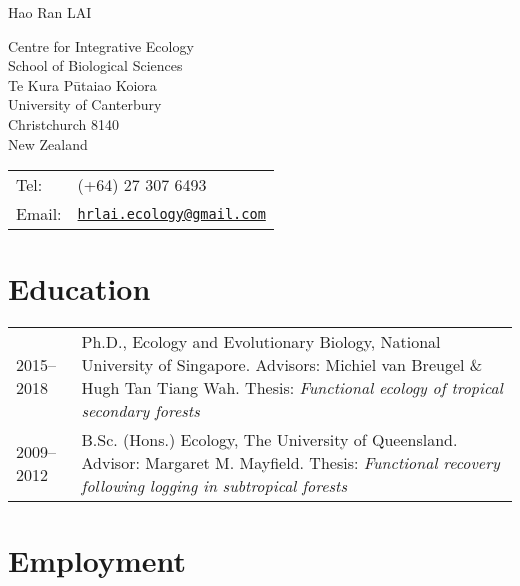 \documentclass[a4paper]{article}
\def\name{Hao Ran LAI}
\begin{document}
{\huge \name}


\vspace{0.25in}

\begin{minipage}{0.45\linewidth}
  Centre for Integrative Ecology \\
  School of Biological Sciences \\
  Te Kura Pūtaiao Koiora  \\
  University of Canterbury \\
  Christchurch 8140 \\
  New Zealand
\end{minipage}
\begin{minipage}{0.45\linewidth}
  \begin{tabular}{ll}
    Tel:   & (+64) 27 307 6493 \\
    Email: & \href{mailto:hrlai.ecology@gmail.com}{\tt hrlai.ecology@gmail.com} \\
  \end{tabular}
\end{minipage}



\section*{Education}

\begin{tabular}{p{0.13\linewidth} p{0.87\linewidth}}

2015--2018 & Ph.D., Ecology and Evolutionary Biology, National University of Singapore. Advisors: Michiel van Breugel \& Hugh Tan Tiang Wah. Thesis: \textit{Functional ecology of tropical secondary forests} \\

2009--2012 & B.Sc. (Hons.) Ecology, The University of Queensland. Advisor: Margaret M. Mayfield. Thesis: \textit{Functional recovery following logging in subtropical forests}\\

\end{tabular}


\section*{Employment}
\end{document}
